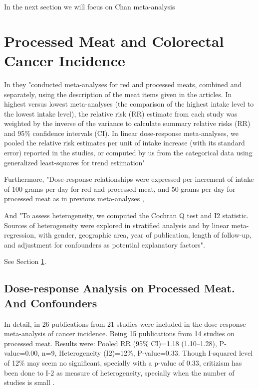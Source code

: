 \documentclass{article}
\begin{document}
In the next section we will focus on Chan meta-analysis \cite{chan}


\section{Processed Meat and Colorectal Cancer Incidence}
\label{sec:headings}

In \cite{chan} they "conducted meta-analyses
for red and processed meats, combined and separately, using the
description of the meat items given in the articles. In highest versus
lowest meta-analyses (the comparison of the highest intake level to
the lowest intake level), the relative risk (RR) estimate from each
study was weighted by the inverse of the variance to calculate
summary relative risks (RR) and 95\% confidence intervals (CI). In
linear dose-response meta-analyses, we pooled the relative risk
estimates per unit of intake increase (with its standard error)
reported in the studies, or computed by us from the categorical
data using generalized least-squares for trend estimation"

Furthermore, "Dose-response relationships were expressed per increment of intake of 100 grams
per day for red and processed meat, and 50 grams per day for processed meat as in previous meta-analyses \cite{aicr}, \cite{sandhu}

And "To assess heterogeneity, we computed the Cochran Q test and I2
statistic. Sources of heterogeneity were explored in stratified
analysis and by linear meta-regression, with gender, geographic
area, year of publication, length of follow-up, and adjustment for
confounders as potential explanatory factors".



See Section \ref{sec:headings}.

\subsection{Dose-response Analysis on Processed Meat. And Confounders}

In detail, in \cite{chan} 26 publications from 21 studies were included in the dose response meta-analysis of cancer incidence. Being 15 publications from 14 studies on processed meat. Results were: Pooled RR (95\% CI)=1.18 (1.10–1.28), P-value=0.00, n=9, Heterogeneity (I2)=12\%, P-value=0.33. Though I-squared level of 12\% may seem no significant, specially with a p-value of 0.33, critizism has been done to I-2 as measure of heterogeneity, specially when the number of studies is small \cite{hippel}.
\end{document}
